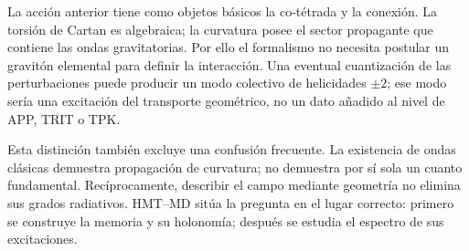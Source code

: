 La acción anterior tiene como objetos básicos la co-tétrada y la conexión.
La torsión de Cartan es algebraica; la curvatura posee el sector propagante que
contiene las ondas gravitatorias.  Por ello el formalismo no necesita
postular un gravitón elemental para definir la interacción.  Una eventual
cuantización de las perturbaciones puede producir un modo colectivo de
helicidades \(\pm2\); ese modo sería una excitación del transporte
geométrico, no un dato añadido al nivel de APP, TRIT o TPK.

Esta distinción también excluye una confusión frecuente.  La existencia de
ondas clásicas demuestra propagación de curvatura; no demuestra por sí sola
un cuanto fundamental.  Recíprocamente, describir el campo mediante
geometría no elimina sus grados radiativos.  HMT--MD sitúa la pregunta en el
lugar correcto: primero se construye la memoria y su holonomía; después se
estudia el espectro de sus excitaciones.

